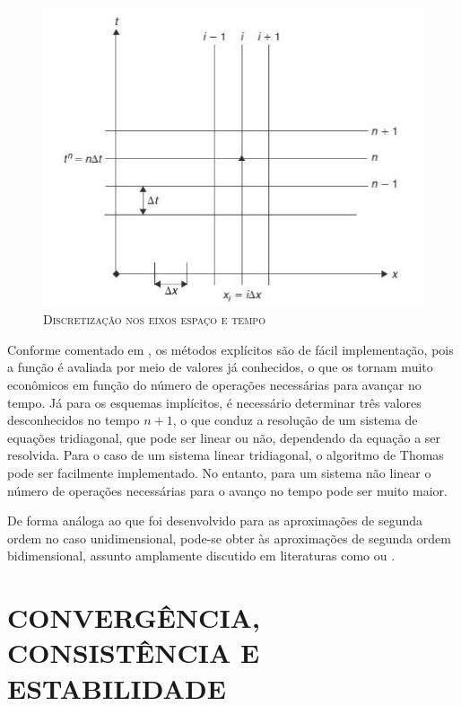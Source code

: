 \begin{figure}[H]
	\centering
	\includegraphics[scale=1]{figuras/espaco_tempo.jpg}
	\caption{\textsc{Discretização nos eixos espaço e tempo}}
	\vspace{-0.1cm}
	\label{fig:espaço_tempo}
\end{figure}


Conforme comentado em , os métodos explícitos são de fácil implementação, pois a função é avaliada por meio de valores já conhecidos, o que os tornam muito econômicos em função do número de operações necessárias para avançar no tempo. Já para os esquemas implícitos, é necessário determinar três valores desconhecidos no tempo $n+1$, o que conduz a resolução de um sistema de equações tridiagonal, que pode ser linear ou não, dependendo da equação a ser resolvida. Para o caso de um sistema linear tridiagonal, o algoritmo de Thomas pode ser facilmente implementado. No entanto, para um sistema não linear o número de operações necessárias para o avanço no tempo pode ser muito maior.

De forma análoga ao que foi desenvolvido para as aproximações de segunda ordem no caso unidimensional, pode-se obter às aproximações de segunda ordem bidimensional, assunto amplamente discutido em literaturas como  ou .


\section{CONVERGÊNCIA, CONSISTÊNCIA E ESTABILIDADE} \label{Conver}

